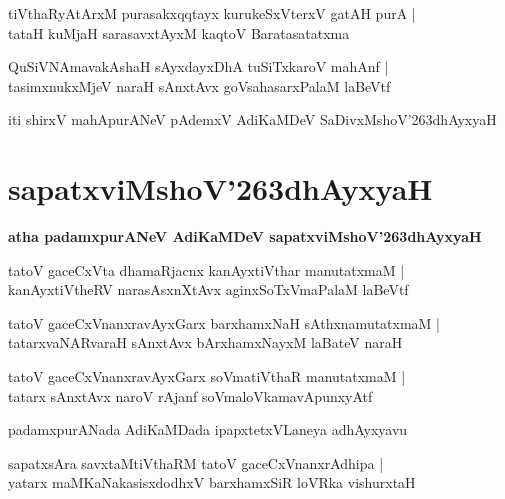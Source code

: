 \documentclass[twoside,12pt,openright]{book}
\def\S{\char'263}
\newcounter{shloka}[chapter]
\begin{document}
\begin{shloka}
tiVthaRyAtArxM purasakxqqtayx kurukeSxVterxV gatAH purA |\\
tataH kuMjaH sarasavxtAyxM kaqtoV Baratasatatxma 
\end{shloka}

\begin{shloka}
QuSiVNAmavakAshaH sAyxdayxDhA tuSiTxkaroV mahAnf |\\
tasimxnukxMjeV naraH sAnxtAvx goVsahasarxPalaM laBeVtf 
\end{shloka}


\begin{center}
iti shirxV mahApurANeV pAdemxV AdiKaMDeV SaDivxMshoV\S dhAyxyaH 
\end{center}


\chapter{sapatxviMshoV\S dhAyxyaH}

\begin{center}
{\LARGE\bfseries atha padamxpurANeV AdiKaMDeV sapatxviMshoV\S dhAyxyaH}
\end{center}

\begin{shloka}
tatoV gaceCxVta dhamaRjacnx kanAyxtiVthar manutatxmaM |\\
kanAyxtiVtheRV narasAsxnXtAvx aginxSoTxVmaPalaM laBeVtf 
\end{shloka}

\begin{shloka}
tatoV gaceCxVnanxravAyxGarx barxhamxNaH sAthxnamutatxmaM |\\
tatarxvaNARvaraH sAnxtAvx bArxhamxNayxM laBateV naraH 
\end{shloka}

\begin{shloka}
tatoV gaceCxVnanxravAyxGarx soVmatiVthaR manutatxmaM |\\
tatarx sAnxtAvx naroV rAjanf soVmaloVkamavApunxyAtf  
\end{shloka}

\begin{center}
padamxpurANada AdiKaMDada ipapxtetxVLaneya adhAyxyavu
\end{center}

\begin{shloka}
sapatxsAra savxtaMtiVthaRM tatoV gaceCxVnanxrAdhipa |\\
yatarx maMKaNakasisxdodhxV barxhamxSiR loVRka vishurxtaH 
\end{shloka}
\end{document}
